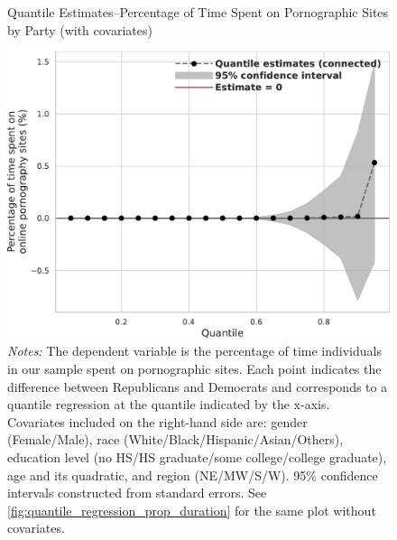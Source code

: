 \documentclass[12pt, letterpaper]{article}
\begin{document}
\begin{figure}[ht]
	\centering
	\caption{Quantile Estimates--Percentage of Time Spent on Pornographic Sites by Party (with covariates)}
	\includegraphics[width=.55\linewidth]{figs/quantile_reg_covariates_proportion_duration_adult.pdf}
	\caption*{\footnotesize \emph{Notes:} 
		The dependent variable is the percentage of time individuals in our sample spent on pornographic sites.
		Each point indicates the difference between Republicans and Democrats and corresponds to a quantile regression at the quantile indicated by the x-axis.
		Covariates included on the right-hand side are: gender (Female/Male), race (White/Black/Hispanic/Asian/Others), education level (no HS/HS graduate/some college/college graduate), age and its quadratic, and region (NE/MW/S/W).
		95\% confidence intervals constructed from standard errors.
		See \cref{fig:quantile_regression_prop_duration} for the same plot without covariates.
	}
	\label{fig:quantile_regression_prop_duration_covariates}
\end{figure}
\clearpage

\FloatBarrier
\end{document}
